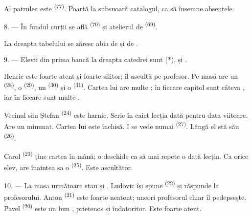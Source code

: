 Al patrulea este  \textsuperscript{(77)}. Poartă la subsuoară
catalogul, ca să însemne absențele.

8. --- În fundul curții se află 
\textsuperscript{(70)} și atelierul de 
\textsuperscript{(69)}.

La dreapta tabelului se zăresc abia  de  și de
.


\VUsaut{2.4mm}

\VUsaut{3.0mm}

9. --- Elevii din prima bancă la dreapta catedrei sunt  (*),
 și .

Henric este foarte atent și foarte silitor; îl ascultă pe profesor. Pe masă are un
 \textsuperscript{(28)}, o  \textsuperscript{(29)}, un
 \textsuperscript{(30)} și o 
\textsuperscript{(31)}. Cartea lui are multe ; în fiecare capitol
sunt câteva , iar în fiecare  sunt multe
.

Vecinul său Ștefan \textsuperscript{(24)} este harnic. Scrie în caiet lecția dată
pentru data viitoare. Are un  minunat. Cartea lui este închisă. I se
vede numai  \textsuperscript{(27)}. Lângă el stă
 său \textsuperscript{(26)}.

Carol \textsuperscript{(23)} ține cartea în mână; o deschide ca să mai repete o
dată lecția. Ca orice elev, are înaintea sa o 
\textsuperscript{(25)}. Este ascultător.

10. --- La masa următoare stau  și . Ludovic
își spune  \textsuperscript{(22)} și răspunde la 
profesorului. Anton \textsuperscript{(21)} este foarte neatent; uneori profesorul
chiar îl pedepsește. Pavel \textsuperscript{(20)} este un bun ,
prietenos și îndatoritor. Este foarte atent.

